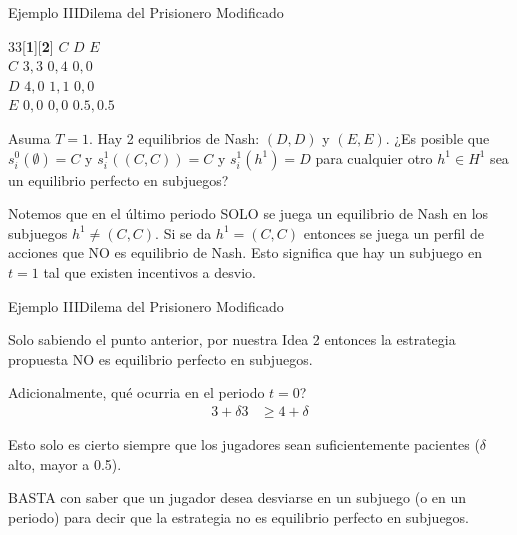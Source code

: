 \documentclass[notes, 11pt]{beamer} %
\newenvironment{wideitemize}{\itemize\addtolength{\itemsep}{10pt}}{\enditemize}
\begin{document}
\begin{frame}{Ejemplo III}{Dilema del Prisionero Modificado}
\begin{center}
	 \begin{game}{3}{3}[\textbf{1}][\textbf{2}]
                  \>$C$         \>$D$    \>$E$    \\
        $C$       \>$3,3$       \>$0,4$  \>$0,0$  \\
        $D$       \>$4,0$       \>$1,1$  \>$0,0$  \\
        $E$       \>$0,0$       \>$0,0$  \>$0.5,0.5$  
 \end{game}
 \end{center}
	\begin{wideitemize}
		\item<1-> Asuma $T=1$. Hay 2 equilibrios de Nash: $(D,D)$ y $(E,E)$. ¿Es posible que $s_{i}^{0}(\emptyset) = C$ y $s_{i}^{1}( (C,C) ) = C$ y $s_{i}^{1}(h^{1}) = D$ para cualquier otro $h^{1} \in H^{1}$ sea un equilibrio perfecto en subjuegos?
		\item<2-> Notemos que en el \'ultimo periodo SOLO se juega un equilibrio de Nash en los subjuegos $h^{1} \neq (C,C)$. Si se da $h^{1} = (C,C)$ entonces se juega un perfil de acciones que NO es equilibrio de Nash. Esto significa que hay un subjuego en $t=1$ tal que existen incentivos a desvio.
	\end{wideitemize}
\end{frame}

\begin{frame}{Ejemplo III}{Dilema del Prisionero Modificado}
	\begin{wideitemize}
		\item<1-> Solo sabiendo el punto anterior, por nuestra Idea 2 entonces la estrategia propuesta NO es equilibrio perfecto en subjuegos.
		\item<2-> Adicionalmente, qu\'e ocurria en el periodo $t=0$?
		\begin{align*}
			3 + \delta 3 & \geq 4 + \delta  
		\end{align*}
		\item<3-> Esto solo es cierto siempre que los jugadores sean suficientemente pacientes ($\delta$ alto, mayor a 0.5).
		\item<4-> BASTA con saber que un jugador desea desviarse en un subjuego (o en un periodo) para decir que la estrategia no es equilibrio perfecto en subjuegos.
	\end{wideitemize}
\end{frame}
\end{document}
